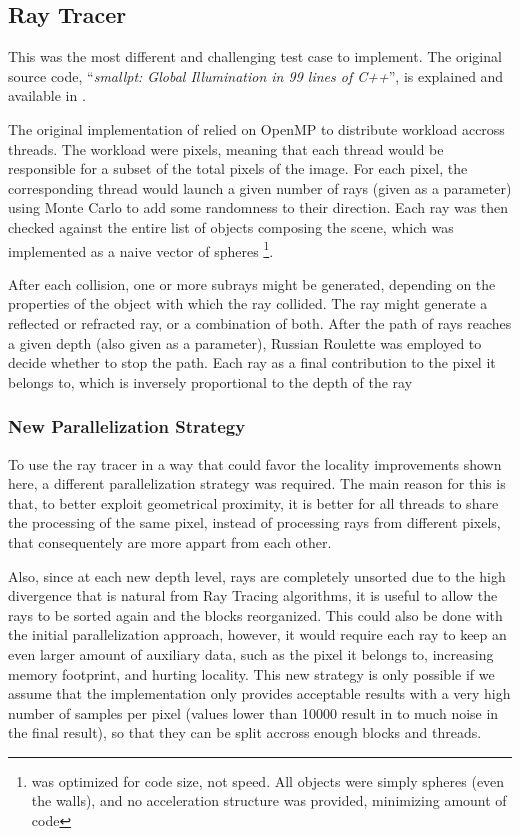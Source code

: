 \subsection{Ray Tracer}
\label{sec:cases:ray}

This was the most different and challenging test case to implement. The original source code, ``\textit{smallpt: Global Illumination in 99 lines of C++}'', is explained and available in \cite{99lines}.

The original implementation of \smallpt relied on OpenMP to distribute workload accross threads. The workload were pixels, meaning that each thread would be responsible for a subset of the total pixels of the image. For each pixel, the corresponding thread would launch a given number of rays (given as a parameter) using Monte Carlo to add some randomness to their direction. Each ray was then checked against the entire list of objects composing the scene, which was implemented as a naive vector of spheres \footnote{\smallpt was optimized for code size, not speed. All objects were simply spheres (even the walls), and no acceleration structure was provided, minimizing amount of code}.

After each collision, one or more subrays might be generated, depending on the properties of the object with which the ray collided. The ray might generate a reflected or refracted ray, or a combination of both. After the path of rays reaches a given depth (also given as a parameter), Russian Roulette was employed to decide whether to stop the path. Each ray as a final contribution to the pixel it belongs to, which is inversely proportional to the depth of the ray

\subsubsection{New Parallelization Strategy}
\label{sec:cases:ray:strat}

To use the ray tracer in a way that could favor the locality improvements shown here, a different parallelization strategy was required. The main reason for this is that, to better exploit geometrical proximity, it is better for all threads to share the processing of the same pixel, instead of processing rays from different pixels, that consequentely are more appart from each other.

Also, since at each new depth level, rays are completely unsorted due to the high divergence that is natural from Ray Tracing algorithms, it is useful to allow the rays to be sorted again and the blocks reorganized. This could also be done with the initial parallelization approach, however, it would require each ray to keep an even larger amount of auxiliary data, such as the pixel it belongs to, increasing memory footprint, and hurting locality.
This new strategy is only possible if we assume that the implementation only provides acceptable results with a very high number of samples per pixel (values lower than 10000 result in to much noise in the final result), so that they can be split accross enough blocks and threads. 




